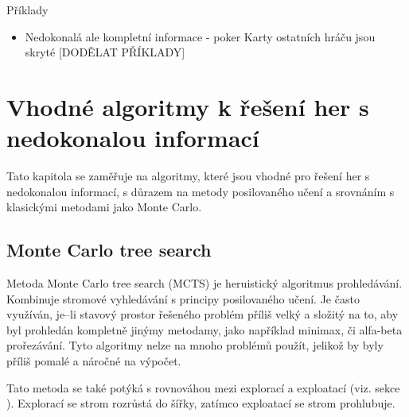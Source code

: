 Příklady
\begin{itemize}
  \item Nedokonalá ale kompletní informace - poker
    Karty ostatních hráču jsou skryté
    {\color {red} [DODĚLAT PŘÍKLADY]}


\end{itemize}


\section{Vhodné algoritmy k řešení her s nedokonalou informací}

Tato kapitola se zaměřuje na algoritmy, které jsou vhodné pro řešení her s nedokonalou informací, s důrazem na metody posilovaného učení a srovnáním s klasickými metodami jako Monte Carlo.

\subsection{Monte Carlo tree search}
Metoda Monte Carlo tree search (MCTS) je heruistický algoritmus prohledávání.
Kombinuje stromové vyhledávání s principy posilovaného učení.
Je často využíván, je--li stavový prostor řešeného problém příliš velký a složitý na to, aby byl prohledán kompletně jinýmy metodamy, jako například minimax, či alfa-beta prořezávání.
Tyto  algoritmy nelze na mnoho problémů použít, jelikož by byly příliš pomalé a náročné na výpočet.

Tato metoda se také potýká s rovnováhou mezi explorací a exploatací (viz. sekce ).
Explorací se strom rozrůstá do šířky, zatímco exploatací se strom prohlubuje.

